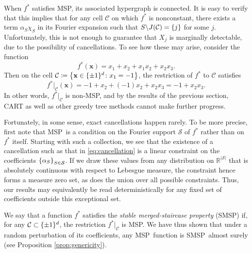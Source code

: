 \documentclass[11pt]{article}
\newtheorem{remark}[theorem]{Remark}
\newcommand{\bx}{\mathbf{x}}
\DeclarePairedDelimiter{\braces}{\lbrace}{\rbrace}
\newcommand{\R}{\mathbb{R}}
\newcommand{\cell}{\mathcal{C}}
\newcommand{\binspace}{\braces{\pm 1}^\nfeats}
\newcommand{\nfeats}{d}
\newcommand{\cellfeatindices}{J}
\newcommand{\MSP}{\textsf{MSP}}
\newcommand{\monomial}{\chi}
\newcommand{\fcoefs}{\mathcal{S}}
\newcommand{\stabmsp}{\textsf{SMSP}}
\newcommand{\comment}[2]{{#2}}
\begin{document}
When $f^*$ satisfies \MSP, its associated hypergraph is connected.
It is easy to verify that this implies that for any cell $\cell$ on which $f^*$ is nonconstant, there exists a term $\alpha_S\monomial_S$ in its Fourier expansion such that $S\backslash \cellfeatindices(\cell) = \braces{j}$ for some $j$.
Unfortunately, this is not enough to guarantee that $X_j$ is marginally detectable, due to the possibility of cancellations.
To see how these may arise, consider the function
\begin{equation}
    f^*(\bx) = x_1 + x_2 + x_1x_2 + x_2x_3.
\end{equation}
Then on the cell $\cell \coloneqq \braces*{ \bx \in \binspace \colon x_1 = -1}$, the restriction of $f^*$ to $\cell$ satisfies
\begin{equation}
\label{eq:cancellation}
    f^*|_\cell(\bx) = -1 + x_2 + (-1)x_2 + x_2x_3 = -1 + x_2x_3.
\end{equation}
In other words, $f^*|_\cell$ is non-\MSP, and by the results of the previous section, CART as well as other greedy tree methods cannot make further progress.


Fortunately, in some sense, exact cancellations happen rarely.
To be more precise, first note that \MSP~is a condition on the Fourier support $\fcoefs$ of $f^*$ rather than on $f^*$ itself.
Starting with such a collection, we see that the existence of a cancellation such as that in \eqref{eq:cancellation} is a linear constraint on the coefficients $\braces*{\alpha_S}_{S \in \fcoefs}$.
If we draw these values from any distribution on $\R^{|\fcoefs|}$ that is absolutely continuous with respect to Lebesgue measure, the constraint hence forms a measure zero set, as does the union over all possible constraints. \comment{red}{Thus, our results may equivalently be read deterministically for any fixed set of coefficients outside this exceptional set.}

We say that a function $f^*$ satisfies the \emph{stable merged-staircase property} (\stabmsp) if, for any $\cell \subset \binspace$, the restriction $f^*|_\cell$ is \MSP.
We have thus shown that under a random perturbation of its coefficients, any \MSP~function is \stabmsp~almost surely (see Proposition \ref{prop:genericity}).
\end{document}
